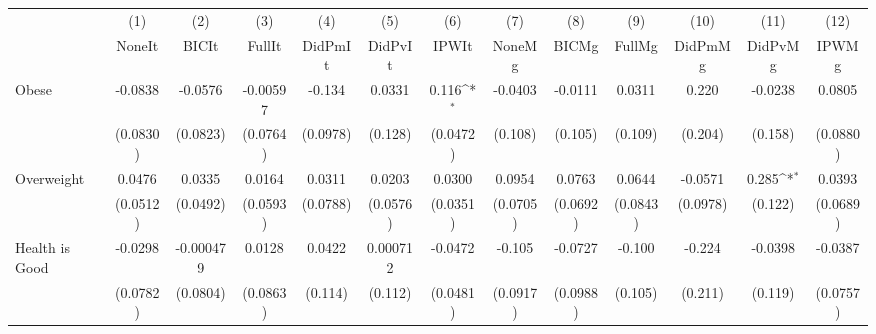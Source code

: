{
\def\sym#1{\ifmmode^{#1}\else\(^{#1}\)\fi}
\begin{tabular}{l*{12}{c}}
\toprule
            &\multicolumn{1}{c}{(1)}&\multicolumn{1}{c}{(2)}&\multicolumn{1}{c}{(3)}&\multicolumn{1}{c}{(4)}&\multicolumn{1}{c}{(5)}&\multicolumn{1}{c}{(6)}&\multicolumn{1}{c}{(7)}&\multicolumn{1}{c}{(8)}&\multicolumn{1}{c}{(9)}&\multicolumn{1}{c}{(10)}&\multicolumn{1}{c}{(11)}&\multicolumn{1}{c}{(12)}\\
            &\multicolumn{1}{c}{NoneIt}&\multicolumn{1}{c}{BICIt}&\multicolumn{1}{c}{FullIt}&\multicolumn{1}{c}{DidPmIt}&\multicolumn{1}{c}{DidPvIt}&\multicolumn{1}{c}{IPWIt}&\multicolumn{1}{c}{NoneMg}&\multicolumn{1}{c}{BICMg}&\multicolumn{1}{c}{FullMg}&\multicolumn{1}{c}{DidPmMg}&\multicolumn{1}{c}{DidPvMg}&\multicolumn{1}{c}{IPWMg}\\
\midrule
Obese       &     -0.0838         &     -0.0576         &    -0.00597         &      -0.134         &      0.0331         &       0.116\sym{*}  &     -0.0403         &     -0.0111         &      0.0311         &       0.220         &     -0.0238         &      0.0805         \\
            &    (0.0830)         &    (0.0823)         &    (0.0764)         &    (0.0978)         &     (0.128)         &    (0.0472)         &     (0.108)         &     (0.105)         &     (0.109)         &     (0.204)         &     (0.158)         &    (0.0880)         \\
\addlinespace
Overweight  &      0.0476         &      0.0335         &      0.0164         &      0.0311         &      0.0203         &      0.0300         &      0.0954         &      0.0763         &      0.0644         &     -0.0571         &       0.285\sym{*}  &      0.0393         \\
            &    (0.0512)         &    (0.0492)         &    (0.0593)         &    (0.0788)         &    (0.0576)         &    (0.0351)         &    (0.0705)         &    (0.0692)         &    (0.0843)         &    (0.0978)         &     (0.122)         &    (0.0689)         \\
\addlinespace
Health is Good&     -0.0298         &   -0.000479         &      0.0128         &      0.0422         &    0.000712         &     -0.0472         &      -0.105         &     -0.0727         &      -0.100         &      -0.224         &     -0.0398         &     -0.0387         \\
            &    (0.0782)         &    (0.0804)         &    (0.0863)         &     (0.114)         &     (0.112)         &    (0.0481)         &    (0.0917)         &    (0.0988)         &     (0.105)         &     (0.211)         &     (0.119)         &    (0.0757)         \\

\end{tabular}}

